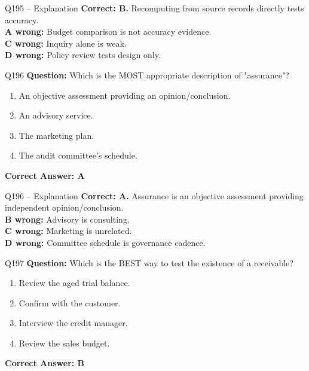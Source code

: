 \documentclass[aspectratio=169,10pt]{beamer}
\begin{document}
	\begin{frame}[t]{Q195 -- Explanation}
		\small
		\textbf{Correct: B.} Recomputing from source records directly tests accuracy. \\[4pt]
		\textbf{A wrong:} Budget comparison is not accuracy evidence. \\[2pt]
		\textbf{C wrong:} Inquiry alone is weak. \\[2pt]
		\textbf{D wrong:} Policy review tests design only.
	\end{frame}
	
	\begin{frame}[t]{Q196}
		\small
		\textbf{Question:} Which is the MOST appropriate description of "assurance"?
		\begin{enumerate}[label=\Alph*.,itemsep=1pt,topsep=2pt]
			\item An objective assessment providing an opinion/conclusion.
			\item An advisory service.
			\item The marketing plan.
			\item The audit committee's schedule.
		\end{enumerate}
		\vspace{4pt}
		\textbf{Correct Answer: A}
	\end{frame}
	
	\begin{frame}[t]{Q196 -- Explanation}
		\small
		\textbf{Correct: A.} Assurance is an objective assessment providing independent opinion/conclusion. \\[4pt]
		\textbf{B wrong:} Advisory is consulting. \\[2pt]
		\textbf{C wrong:} Marketing is unrelated. \\[2pt]
		\textbf{D wrong:} Committee schedule is governance cadence.
	\end{frame}
	
	\begin{frame}[t]{Q197}
		\small
		\textbf{Question:} Which is the BEST way to test the existence of a receivable?
		\begin{enumerate}[label=\Alph*.,itemsep=1pt,topsep=2pt]
			\item Review the aged trial balance.
			\item Confirm with the customer.
			\item Interview the credit manager.
			\item Review the sales budget.
		\end{enumerate}
		\vspace{4pt}
		\textbf{Correct Answer: B}
	\end{frame}
	
\end{document}

